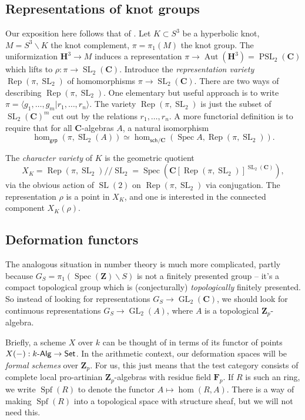 \documentclass[oneside]{amsart}
\DeclareMathOperator{\automorphism}{Aut}
\DeclareMathOperator{\formalspectrum}{Spf}
\DeclareMathOperator{\GL}{GL}
\DeclareMathOperator{\PSL}{PSL}
\DeclareMathOperator{\representation}{Rep}
\DeclareMathOperator{\SL}{SL}
\DeclareMathOperator{\spectrum}{Spec}
\newcommand{\dC}{\mathbf{C}}
\newcommand{\dF}{\mathbf{F}}
\newcommand{\dH}{\mathbf{H}}
\newcommand{\dZ}{\mathbf{Z}}
\begin{document}
\subsection{Representations of knot groups}

Our exposition here follows that of \cite[ch.13-14]{m12}. Let 
$K\subset S^3$ be a hyperbolic knot, $M=S^3\smallsetminus K$ the knot 
complement, $\pi=\pi_1(M)$ the knot group. The uniformization $\dH^3\to M$ 
induces a representation $\pi \to \automorphism(\dH^3) = \PSL_2(\dC)$ which 
lifts to $\rho:\pi \to \SL_2(\dC)$. Introduce the \emph{representation 
variety} $\representation(\pi,\SL_2)$ of homomorphisms $\pi\to \SL_2(\dC)$. 
There are two ways of describing $\representation(\pi,\SL_2)$. One elementary 
but useful approach is to write 
$\pi=\langle g_1,\dots,g_m|r_1,\dots,r_n\rangle$. The variety 
$\representation(\pi,\SL_2)$ is just the subset of $\SL_2(\dC)^m$ cut out by 
the relations $r_1,\dots,r_n$. A more functorial definition is to require that 
for all $\dC$-algebras $A$, a natural isomorphism 
\[
  \hom_\mathsf{grp}(\pi,\SL_2(A)) \simeq \hom_{\mathsf{sch}/\dC}(\spectrum A,\representation(\pi,\SL_2)) .
\]

The \emph{character variety} of $K$ is the geometric quotient 
\[
  X_K = \representation(\pi,\SL_2) /\!\!/ \SL_2 = \spectrum\left(\dC[\representation(\pi,\SL_2)]^{\SL_2(\dC)}\right) ,
\]
via the obvious action of $\SL(2)$ on $\representation(\pi,\SL_2)$ via 
conjugation. The representation $\rho$ is a point in $X_K$, and one is 
interested in the connected component $X_K(\rho)$. 


\subsection{Deformation functors}

The analogous situation in number theory is much more complicated, partly 
because $G_S=\pi_1(\spectrum(\dZ)\smallsetminus S)$ is not a finitely presented 
group -- it's a compact topological group which is (conjecturally) 
\emph{topologically} finitely presented. So instead of looking for 
representations $G_S\to \GL_2(\dC)$, we should look for continuous 
representations $G_S\to \GL_2(A)$, where $A$ is a topological $\dZ_p$-algebra. 

Briefly, a scheme $X$ over $k$ can be thought of in terms of its functor of 
points $X(-):k\textnormal{-}\mathsf{Alg}\to \mathsf{Set}$. In the arithmetic 
context, our deformation spaces will be \emph{formal schemes} over $\dZ_p$. For 
us, this just means that the test category consists of complete local 
pro-artinian $\dZ_p$-algebras with residue field $\dF_p$. If $R$ is such an 
ring, we write $\formalspectrum(R)$ to denote the functor 
$A\mapsto\hom(R,A)$. There is a way of making $\formalspectrum(R)$ into a 
topological space with structure sheaf, but we will not need this. 
\end{document}
